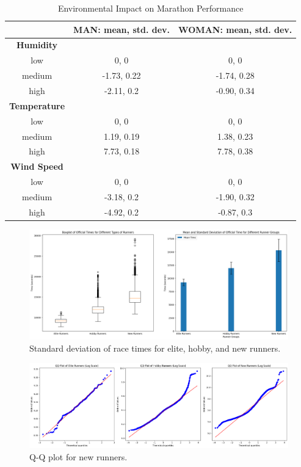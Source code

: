 \documentclass[conference]{IEEEtran}
\begin{document}
\begin{table}[htbp]
\caption{Environmental Impact on Marathon Performance}
\begin{center}
\begin{tabular}{|c|c|c|}
\hline
\textbf{} & \textbf{MAN: mean, std. dev.} & \textbf{WOMAN: mean, std. dev.} \\
\hline
\textbf{Humidity} & & \\
\hline
low & 0, 0 & 0, 0 \\
\hline
medium & -1.73, 0.22 & -1.74, 0.28 \\
\hline
high & -2.11, 0.2 & -0.90, 0.34 \\
\hline
\textbf{Temperature} & & \\
\hline
low & 0, 0 & 0, 0 \\
\hline
medium & 1.19, 0.19 & 1.38, 0.23 \\
\hline
high & 7.73, 0.18 & 7.78, 0.38 \\
\hline
\textbf{Wind Speed} & & \\
\hline
low & 0, 0 & 0, 0 \\
\hline
medium & -3.18, 0.2 & -1.90, 0.32 \\
\hline
high & -4.92, 0.2 & -0.87, 0.3 \\
\hline
\end{tabular}
\label{tab:environmental_impact}
\end{center}
\end{table}

\begin{figure}[htbp]
    \centerline{\includegraphics[width=\linewidth]{figs/elite_hobby_new_standar_deviation.png}}
    \caption{Standard deviation of race times for elite, hobby, and new runners.}
    \label{fig:elite_hobby_new_standar_deviation}
\end{figure}

\begin{figure}[htbp]
    \centerline{\includegraphics[width=\linewidth]{figs/elite_hobby_new_qq.png}}
    \caption{Q-Q plot for new runners.}
    \label{fig:new_qq}
\end{figure}
\end{document}
